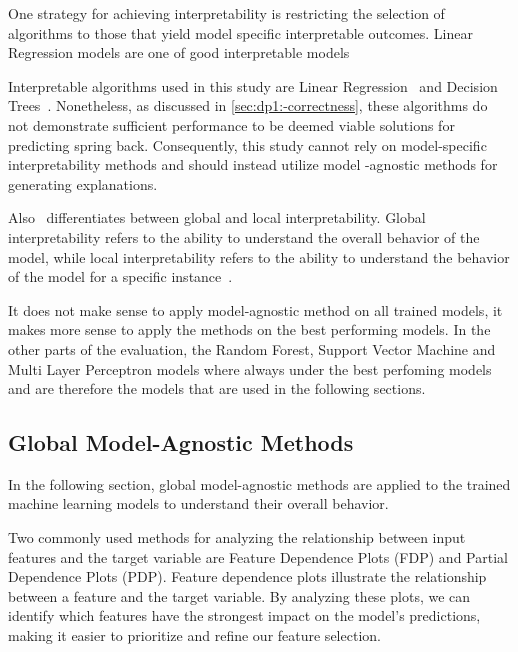 
One strategy for achieving interpretability is restricting the selection of algorithms to those that yield
model specific interpretable outcomes.
Linear Regression models are one of good interpretable models~\cite[p. 17]{hall2019introduction}

Interpretable algorithms used in this study are Linear Regression~\cite[p. 17]{hall2019introduction} and Decision
Trees~\cite[p. 20]{hall2019introduction}.
Nonetheless, as discussed in \cref{sec:dp1:-correctness}, these algorithms do not demonstrate sufficient
performance to be deemed viable solutions for predicting spring back.
Consequently, this study cannot rely on model-specific interpretability methods and should instead utilize model
-agnostic methods for generating explanations.

Also~\cite{hall2019introduction} differentiates between global and local interpretability.
Global interpretability refers to the ability to understand the overall behavior of
the model, while local interpretability refers to the ability to understand the behavior of the
model for a specific instance~\cite[p. 19]{hall2019introduction}.

It does not make sense to apply model-agnostic method on all trained models, it makes more sense to
apply the methods on the best performing models.
In the other parts of the evaluation, the Random Forest, Support Vector Machine and Multi Layer Perceptron models
where always under the best perfoming models and are therefore the models that are used in the following
sections.

\subsection{Global Model-Agnostic Methods}\label{subsec:global-model-agnostic-methods}
In the following section, global model-agnostic methods are applied to the trained machine learning models to
understand their overall behavior.

Two commonly used methods for analyzing the relationship between input features
and the target variable are Feature Dependence Plots (FDP) and Partial Dependence Plots (PDP).
Feature dependence plots illustrate the relationship between a feature and the target variable.
By analyzing these plots, we can identify which features have the strongest impact on the model's
predictions, making it easier to prioritize and refine our feature selection.

